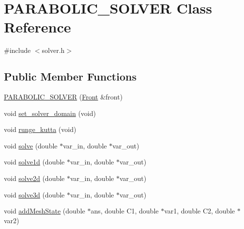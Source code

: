 \hypertarget{class_p_a_r_a_b_o_l_i_c___s_o_l_v_e_r}{}\section{P\+A\+R\+A\+B\+O\+L\+I\+C\+\_\+\+S\+O\+L\+V\+ER Class Reference}
\label{class_p_a_r_a_b_o_l_i_c___s_o_l_v_e_r}


{\ttfamily \#include $<$solver.\+h$>$}

\subsection*{Public Member Functions}
\begin{DoxyCompactItemize}
\item 
\hyperlink{class_p_a_r_a_b_o_l_i_c___s_o_l_v_e_r_a6ebe3cdacdd75515a27489ae05b61508}{P\+A\+R\+A\+B\+O\+L\+I\+C\+\_\+\+S\+O\+L\+V\+ER} (\hyperlink{fdecs_8h_ac32202b798f848095c489cfd04c4ca5f}{Front} \&front)
\item 
void \hyperlink{class_p_a_r_a_b_o_l_i_c___s_o_l_v_e_r_a62cad8d668bd290a8258ea4cdf82a28c}{set\+\_\+solver\+\_\+domain} (void)
\item 
void \hyperlink{class_p_a_r_a_b_o_l_i_c___s_o_l_v_e_r_a52275c506dbca4080e2bb548a74f38c4}{runge\+\_\+kutta} (void)
\item 
void \hyperlink{class_p_a_r_a_b_o_l_i_c___s_o_l_v_e_r_a7a3a805ad204461dcc19047e6f0ccbbb}{solve} (double $\ast$var\+\_\+in, double $\ast$var\+\_\+out)
\item 
void \hyperlink{class_p_a_r_a_b_o_l_i_c___s_o_l_v_e_r_a5a479e6e89727764e34d6f36795e04e3}{solve1d} (double $\ast$var\+\_\+in, double $\ast$var\+\_\+out)
\item 
void \hyperlink{class_p_a_r_a_b_o_l_i_c___s_o_l_v_e_r_a5d023da38b977e93158afa5c433c6c8f}{solve2d} (double $\ast$var\+\_\+in, double $\ast$var\+\_\+out)
\item 
void \hyperlink{class_p_a_r_a_b_o_l_i_c___s_o_l_v_e_r_ae501eb93d0e003ade2207668aa936b77}{solve3d} (double $\ast$var\+\_\+in, double $\ast$var\+\_\+out)
\item 
void \hyperlink{class_p_a_r_a_b_o_l_i_c___s_o_l_v_e_r_a821a09ceed6d80d5a5ba684afab12692}{add\+Mesh\+State} (double $\ast$ans, double C1, double $\ast$var1, double C2, double $\ast$var2)
\end{DoxyCompactItemize}
